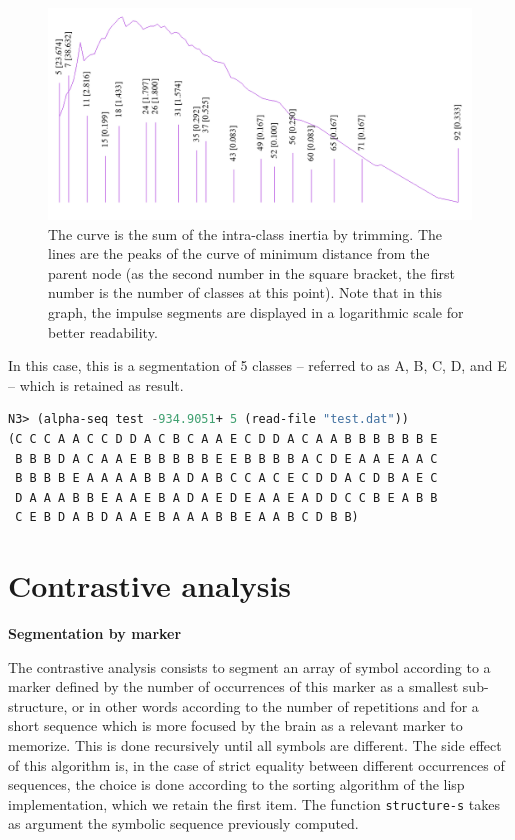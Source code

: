 \begin{figure}[!hbt]
	\begin{center}
		\includegraphics[scale=0.35]{img/4412}
		\caption{The curve is the sum of the intra-class inertia by trimming. The lines are the peaks of the curve of minimum distance from the parent node (as the second number in the square bracket, the first number is the number of classes at this point). 
		Note that in this graph, the impulse segments are displayed in a logarithmic scale for better readability.}
		\label{fig:seg}
	\end{center}
\end{figure}
	
In this case, this is a segmentation of 5 classes -- referred to as A, B, C, D, and E -- which is retained as result.

\smallskip

\begin{lstlisting}[language=Lisp]
N3> (alpha-seq test -934.9051+ 5 (read-file "test.dat"))
(C C C A A C C D D A C B C A A E C D D A C A A B B B B B B E 
 B B B D A C A A E B B B B B E E B B B B A C D E A A E A A C
 B B B B E A A A A B B A D A B C C A C E C D D A C D B A E C
 D A A A B B E A A E B A D A E D E A A E A D D C C B E A B B
 C E B D A B D A A E B A A A B B E A A B C D B B)
\end{lstlisting}

\section{Contrastive analysis}

\textbf{Segmentation by marker}
\smallskip

The contrastive analysis consists to segment an array of symbol according to a marker defined by the number of occurrences of this marker as a smallest sub-structure, or in other words according to the number of repetitions and for a short sequence which is more focused by the brain as a relevant marker to memorize. This is done recursively until all symbols are different. The side effect of this algorithm is, in the case of strict equality between different occurrences of sequences, the choice is done according to the sorting algorithm of the lisp implementation, which we retain the first item. The function \texttt{structure-s} takes as argument the symbolic sequence previously computed.

